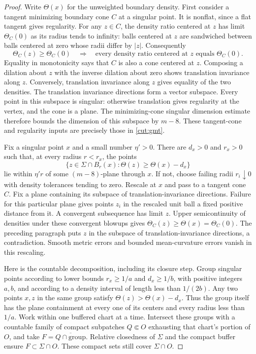 \begin{proof}
Write $\Theta(x)$ for the unweighted boundary density.  First consider
a tangent minimizing boundary cone $C$ at a singular point.  It is
nonflat, since a flat tangent gives regularity.  For any $z\in C$, the
density ratio centered at $z$ has limit $\Theta_C(0)$ as its radius
tends to infinity: balls centered at $z$ are sandwiched between balls
centered at zero whose radii differ by $|z|$.  Consequently
\[
 \Theta_C(z)\ge\Theta_C(0)
 \quad\Longrightarrow\quad
 \text{every density ratio centered at $z$ equals $\Theta_C(0)$}.
\]
Equality in monotonicity says that $C$ is also a cone centered at $z$.
Composing a dilation about $z$ with the inverse dilation about zero
shows translation invariance along $z$.  Conversely, translation
invariance along $z$ gives equality of the two densities.  The
translation invariance directions form a vector subspace.
Every point in this subspace is singular: otherwise translation gives regularity
at the vertex, and the cone is a plane.  The minimizing-cone singular
dimension estimate therefore bounds the dimension of this subspace by $m-8$.
These tangent-cone and regularity inputs are precisely those in
\cref{cut:gmt}.

Fix a singular point $x$ and a small number $\eta'>0$.  There are
$d_x>0$ and $r_x>0$ such that, at every radius $r<r_x$, the points
\begin{equation}\label{local:high-density}
 \{z\in\Sigma\cap B_r(x):\Theta(z)\ge\Theta(x)-d_x\}
\end{equation}
lie within $\eta'r$ of some $(m-8)$-plane through $x$.  If not, choose
failing radii $r_i\downarrow0$ with density tolerances tending to zero.
Rescale at $x$ and pass to a tangent cone $C$.  Fix a plane containing
its subspace of translation-invariance directions.  Failure for this particular plane gives points $z_i$ in
the rescaled unit ball a fixed positive distance from it.  A convergent
subsequence has limit $z$.  Upper semicontinuity of densities under
these convergent blowups gives
$\Theta_C(z)\ge\Theta(x)=\Theta_C(0)$.  The preceding paragraph puts
$z$ in the subspace of translation-invariance directions, a contradiction.  Smooth metric errors and bounded
mean-curvature errors vanish in this rescaling.

Here is the countable decomposition, including its closure step.
Group singular points according to lower bounds
$r_x\ge1/a$ and $d_x\ge1/b$, with positive integers $a,b$, and according
to a density interval of length less than $1/(2b)$.  Any two points
$x,z$ in the same group satisfy $\Theta(z)>\Theta(x)-d_x$.
Thus the group itself has the plane containment at every one of its
centers and every radius less than $1/a$.  Work within one buffered chart at a time.  Intersect these groups
with a countable family of compact subpatches $Q\Subset O$ exhausting
that chart's portion of $O$, and take
$F=\overline{Q\cap\text{group}}$.  Relative closedness of $\Sigma$
and the compact buffer ensure $F\subset\Sigma\cap O$.
These compact sets still cover $\Sigma\cap O$.


\end{proof}
